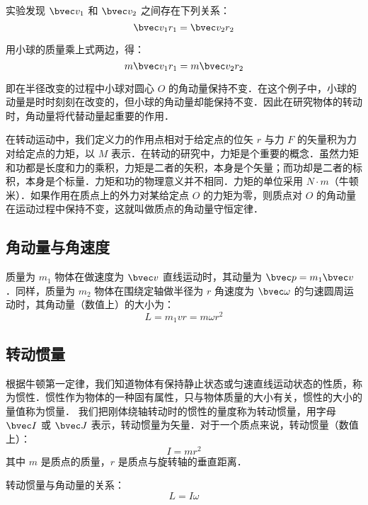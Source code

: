 实验发现 $\bvec v_1$ 和 $\bvec v_2$ 之间存在下列关系：
\begin{equation}
\bvec v_1r_1=\bvec v_2r_2
\end{equation}

用小球的质量乘上式两边，得：
\begin{equation}
m\bvec v_1r_1=m\bvec v_2r_2
\end{equation}

即在半径改变的过程中小球对圆心 $O$ 的角动量保持不变．在这个例子中，小球的动量是时时刻刻在改变的，但小球的角动量却能保持不变．因此在研究物体的转动时，角动量将代替动量起重要的作用．

在转动运动中，我们定义力的作用点相对于给定点的位矢 $r$ 与力 $F$ 的矢量积为力对给定点的力矩，以 $M$ 表示．在转动的研究中，力矩是个重要的概念．虽然力矩和功都是长度和力的乘积，力矩是二者的矢积，本身是个矢量；而功却是二者的标积，本身是个标量．力矩和功的物理意义并不相同．力矩的单位采用 $N\cdot m$（牛顿米）．如果作用在质点上的外力对某给定点 $O$ 的力矩为零，则质点对 $O$ 的角动量在运动过程中保持不变，这就叫做质点的角动量守恒定律．
\subsection{角动量与角速度}
质量为 $m_1$ 物体在做速度为 $\bvec v$ 直线运动时，其动量为 $\bvec p=m_1\bvec v$．同样，质量为 $m_2$ 物体在围绕定轴做半径为 $r$ 角速度为 $\bvec \omega$ 的匀速圆周运动时，其角动量（数值上）的大小为：
\begin{equation}
L=m_1vr=m\omega r^2
\end{equation}
\subsection{转动惯量}
根据牛顿第一定律，我们知道物体有保持静止状态或匀速直线运动状态的性质，称为惯性．惯性作为物体的一种固有属性，只与物体质量的大小有关，惯性的大小的量值称为惯量．
我们把刚体绕轴转动时的惯性的量度称为转动惯量，用字母 $\bvec I$ 或 $\bvec J$ 表示，转动惯量为矢量．对于一个质点来说，转动惯量（数值上）：
\begin{equation}
I=mr^{2}
\end{equation}
其中 $m$ 是质点的质量，$r$ 是质点与旋转轴的垂直距离．

转动惯量与角动量的关系：
\begin{equation}
L=I\omega
\end{equation}

